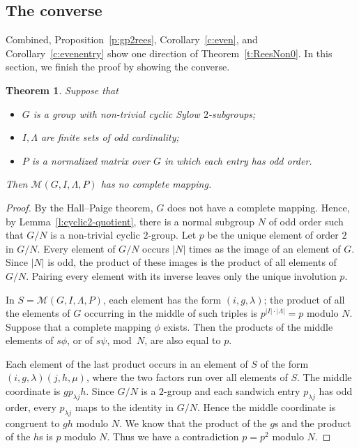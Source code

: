 \documentclass[11pt]{article}
\theoremstyle{plain}
\newtheorem{theorem}{Theorem}[section]
\theoremstyle{remark}
\theoremstyle{definition}
\theoremstyle{plain}
\begin{document}
\subsection{The converse}
Combined, Proposition~\ref{p:gp2rees}, Corollary~\ref{c:even}, and Corollary~\ref{c:evenentry} show one direction of Theorem~\ref{t:ReesNon0}. In this section, we finish the proof by showing the converse.

\begin{theorem}\label{t:converse}
Suppose that
\begin{itemize}
\item[(a)] $G$ is a group with non-trivial cyclic Sylow $2$-subgroups;
\item[(b)] $I,\Lambda$ are finite sets of odd cardinality;
\item[(c)] $P$ is a normalized matrix over $G$ in which each entry has odd order.
\end{itemize}
Then $\mathcal{M}(G,I,\Lambda,P)$ has no complete mapping.
\end{theorem}
\begin{proof}
By the Hall--Paige theorem, $G$ does not have a complete mapping. Hence, by
Lemma~\ref{l:cyclic2-quotient}, there is a normal subgroup $N$ of odd order
such that $G/N$ is a non-trivial cyclic $2$-group. Let $p$ be the unique
element of order $2$ in $G/N$. Every element of $G/N$ occurs $|N|$ times as the image of an element of $G$. Since $|N|$ is odd, the product of these images is the product of all elements of $G/N$. Pairing every element with its inverse leaves only the unique involution $p$.

In $S=\mathcal{M}(G,I,\Lambda,P)$, each element has the form $(i,g,\lambda)$;
the product of all the elements of $G$ occurring in the middle of such triples
is $p^{|I|\cdot|\Lambda|}=p$ modulo $N$. Suppose that a complete mapping $\phi$ exists. Then the products of the middle elements of $s\phi$, or of $s\psi$, mod~$N$, are also equal to $p$.

Each element of the last product occurs in an element of $S$ of the form
$(i,g,\lambda)(j,h,\mu)$, where the two factors run over all elements of $S$.
The middle coordinate is $g p_{\lambda j}h$. Since $G/N$ is a $2$-group and each sandwich entry $p_{\lambda j}$ has odd order, every $p_{\lambda j}$ maps to the identity in $G/N$. Hence the middle coordinate is congruent to $gh$ modulo $N$. We know that the
product of the $g$s and the product of the $h$s is $p$ modulo $N$. Thus we have a contradiction $p=p^2$ modulo $N$.
\end{proof}
\end{document}
